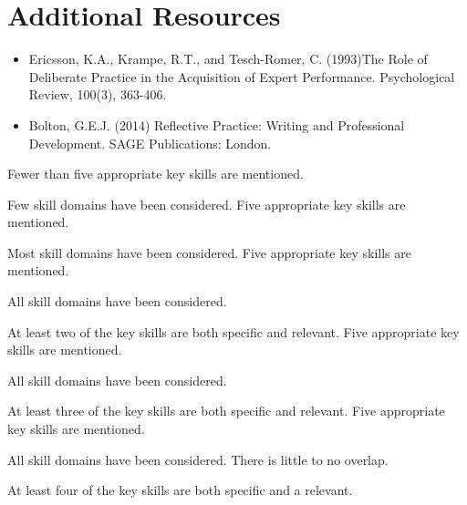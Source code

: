 \documentclass{../fal_assignment}
\begin{document}
\section*{Additional Resources}

\begin{itemize}
    \item Ericsson, K.A., Krampe, R.T., and Tesch-Romer, C. (1993)The Role of Deliberate Practice in the Acquisition of Expert Performance. Psychological Review, 100(3), 363-406.
    \item Bolton, G.E.J. (2014) Reflective Practice: Writing and Professional Development. SAGE Publications: London.
\end{itemize}

\rubricyeartwo

\begin{markingrubric}
%
%
        \grade \fail  	Fewer than five appropriate key skills are mentioned.
         \par 		Few skill domains have been considered.
        \grade 		Five appropriate key skills are mentioned.
        \par 		Most skill domains have been considered.
        \grade 		Five appropriate key skills are mentioned.
        \par 		All skill domains have been considered.
        \par 		At least two of the key skills are both specific and relevant.
        \grade 		Five appropriate key skills are mentioned.
        \par 		All skill domains have been considered.
        \par 		At least three of the key skills are both specific and relevant.
        \grade 		Five appropriate key skills are mentioned.
        \par 		All skill domains have been considered. There is little to no overlap.
        \par 		At least four of the key skills are both specific and a relevant.

\end{markingrubric}
\end{document}
